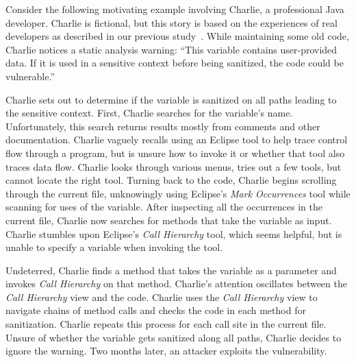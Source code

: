\documentclass[conference]{IEEEtran}
\begin{document}

Consider the following motivating example involving Charlie, a professional Java developer. 
Charlie is fictional, but this story is based on the experiences of real developers as described in our previous study~\cite{Smith2015}.
While maintaining some old code, Charlie notices a static analysis warning: ``This variable contains user-provided data. 
If it is used in a sensitive context before being sanitized, the code could be vulnerable.''

Charlie sets out to determine if the variable is sanitized on all paths leading to the sensitive context.
First, Charlie searches for the variable's name.
Unfortunately, this search returns results mostly from comments and other documentation.
Charlie vaguely recalls using an Eclipse tool to help trace control flow through a program, but is unsure how to invoke it or whether that tool also traces data flow.
Charlie looks through various menus, tries out a few tools, but cannot locate the right tool.
Turning back to the code, Charlie begins scrolling through the current file, unknowingly using Eclipse's \emph{Mark Occurrences} tool while scanning for uses of the variable. 
After inspecting all the occurrences in the current file, Charlie now searches for methods that take the variable as input.
Charlie stumbles upon Eclipse's \emph{Call Hierarchy} tool, which seems helpful, but is unable to specify a variable when invoking the tool.

Undeterred, Charlie finds a method that takes the variable as a parameter and invokes \emph{Call Hierarchy} on that method.
Charlie's attention oscillates between the \emph{Call Hierarchy} view and the code.
Charlie uses the \emph{Call Hierarchy} view to navigate chains of method calls and checks the code in each method for sanitization.
Charlie repeats this process for each call site in the current file. 
Unsure of whether the variable gets sanitized along all paths, Charlie decides to ignore the warning.
Two months later, an attacker exploits the vulnerability. 
\end{document}

